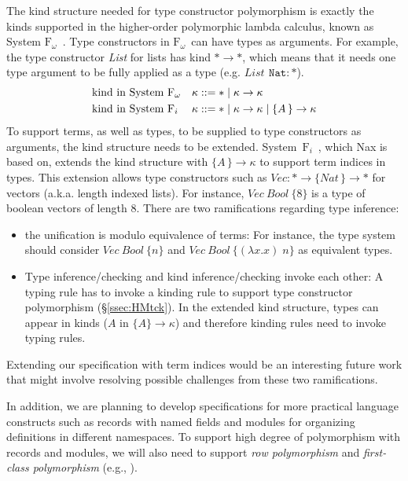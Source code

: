 \documentclass[runningheads,a4paper]{llncs}
\newcommand{\Fw}{\ensuremath{\mathrm{F}_\omega}}
\newcommand{\Fi}{\ensuremath{\mathrm{F}_i}}
\begin{document}
The kind structure needed for type constructor polymorphism is exactly
the kinds supported in the higher-order polymorphic lambda calculus,
known as System \Fw\ \cite{girard72thesis}.
Type constructors in \Fw\ can have types as arguments.
For example, the type constructor \textit{List}
for lists has kind $* \to *$, which means that it needs one type argument
to be fully applied as a type (e.g. $\textit{List}\,~\texttt{Nat} : *$).
\begin{align*}
  &\text{kind in System \Fw}  &&\kappa ::= * \mid \kappa \to \kappa \\
  &\text{kind in System \Fi}  &&\kappa ::= * \mid \kappa \to \kappa
                                             \mid \{A\,\}\to \kappa
\end{align*}
To support terms, as well as types, to be supplied to type constructors
as arguments, the kind structure needs to be extended.
System~\Fi\ \cite{AhnSheFioPit13}, which Nax is based on, extends
the kind structure with $\{A\,\}\to \kappa$ to support term indices in types.
This extension allows type constructors 
such as $\textit{Vec} : * \to \{\textit{Nat}\,\} \to *$ for vectors
(a.k.a. length indexed lists). For instance,
$\textit{Vec}~\textit{Bool}~\{8\}$ is a type of boolean vectors of length 8.
There are two ramifications regarding type inference:
\begin{itemize}\vspace*{-.75ex}
\item the unification is modulo equivalence of terms: For instance,
  the type system should consider $\textit{Vec}~\textit{Bool}~\{n\}$ and
  $\textit{Vec}~\textit{Bool}~\{(\lambda x.x)\;n\}$ as equivalent types.
  \vspace*{.5ex}
\item Type inference/checking and kind inference/checking invoke each other:
  A typing rule has to invoke a kinding rule to support
  type constructor polymorphism  (\S\ref{ssec:HMtck}).
  In the extended kind structure, types can appear in kinds
  ($A$ in $\{\!A\}\to\kappa$) and therefore kinding rules
  need to invoke typing rules.
\end{itemize}
Extending our specification with term indices would be
an interesting future work that might involve resolving possible challenges
from these two ramifications.

In addition, we are planning to develop specifications for more practical
language constructs such as records with named fields and modules for
organizing definitions in different namespaces. To support high degree of
polymorphism with records and modules, we will also need to support
\emph{row polymorphism} \cite{Gaster96apolymorphic} and
\emph{first-class polymorphism} (e.g., \cite{QML09}).
\end{document}
